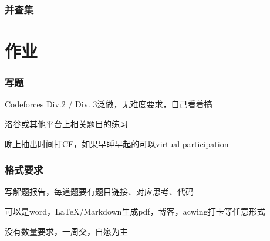 \documentclass{beamer}
\begin{document}
  \begin{frame}
    \frametitle{并查集}
  \end{frame}

  \section{作业}
  \begin{frame}
    \frametitle{写题}
    Codeforces Div.2 / Div. 3泛做，无难度要求，自己看着搞

    \vspace*{1\baselineskip}
    
    洛谷或其他平台上相关题目的练习

    \vspace*{1\baselineskip}

    晚上抽出时间打CF，如果早睡早起的可以virtual participation
  \end{frame}

  \begin{frame}[fragile]
    \frametitle{格式要求}

    写解题报告，每道题要有题目链接、对应思考、代码

    \vspace*{1\baselineskip}
    
    可以是word，\LaTeX/Markdown生成pdf，博客，acwing打卡等任意形式

    \vspace*{1\baselineskip}

    没有数量要求，一周交，自愿为主
  \end{frame}
\end{document}
